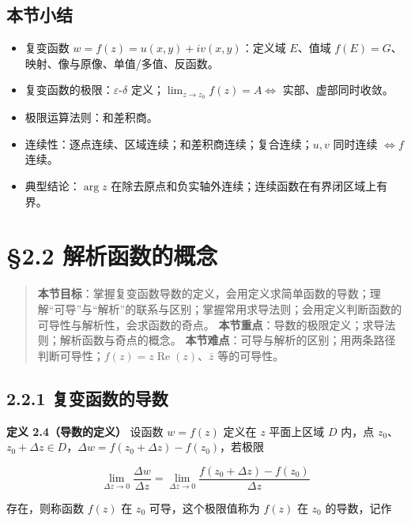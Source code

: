 \subsection{本节小结}\label{ux672cux8282ux5c0fux7ed3-3}

\begin{itemize}
\tightlist
\item
  复变函数 \(w=f(z)=u(x,y)+iv(x,y)\)：定义域 \(E\)、值域
  \(f(E)=G\)、映射、像与原像、单值/多值、反函数。
\item
  复变函数的极限：\(\varepsilon\)-\(\delta\)
  定义；\(\lim_{z\to z_0}f(z)=A \iff\) 实部、虚部同时收敛。
\item
  极限运算法则：和差积商。
\item
  连续性：逐点连续、区域连续；和差积商连续；复合连续；\(u,v\) 同时连续
  \(\iff f\) 连续。
\item
  典型结论：\(\arg z\)
  在除去原点和负实轴外连续；连续函数在有界闭区域上有界。
\end{itemize}

\section{§2.2
解析函数的概念}\label{ux89e3ux6790ux51fdux6570ux7684ux6982ux5ff5}

\begin{quote}
\textbf{本节目标}：掌握复变函数导数的定义，会用定义求简单函数的导数；理解``可导''与``解析''的联系与区别；掌握常用求导法则；会用定义判断函数的可导性与解析性，会求函数的奇点。
\textbf{本节重点}：导数的极限定义；求导法则；解析函数与奇点的概念。
\textbf{本节难点}：可导与解析的区别；用两条路径判断可导性；\(f(z)=z\operatorname{Re}(z)\)、\(\bar z\)
等的可导性。
\end{quote}

\subsection{2.2.1
复变函数的导数}\label{ux590dux53d8ux51fdux6570ux7684ux5bfcux6570}

\textbf{定义 2.4（导数的定义）} 设函数 \(w=f(z)\) 定义在 \(z\)
平面上区域 \(D\) 内，点
\(z_0\)、\(z_0+\Delta z\in D\)，\(\Delta w=f(z_0+\Delta z)-f(z_0)\)，若极限

\[
\lim_{\Delta z\to0}\frac{\Delta w}{\Delta z}
=\lim_{\Delta z\to0}\frac{f(z_0+\Delta z)-f(z_0)}{\Delta z}
\]

存在，则称函数 \(f(z)\) 在 \(z_0\) 可导，这个极限值称为 \(f(z)\) 在
\(z_0\) 的导数，记作

